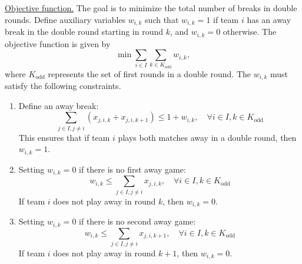 \documentclass{article}
\begin{document}
\medskip
\noindent
\underline{Objective function.}
The goal is to minimize the total number of breaks in double rounds. Define auxiliary variables $w_{i,k}$ such that $w_{i,k}=1$ if team $i$ has an away break in the double round starting in round $k$, and $w_{i,k}=0$ otherwise. The objective function is given by
\begin{equation}
    \min \sum_{i \in I} \sum_{k \in K_{\text{odd}}} w_{i,k},
\end{equation}
where $K_{\text{odd}}$ represents the set of first rounds in a double round.
The $w_{i,k}$ must satisfy the following constraints.
\begin{enumerate}
    \item Define an away break:
    \begin{equation}
    \sum_{j \in I, j \neq i} (x_{j,i,k} + x_{j,i,k+1}) \leq 1 + w_{i,k}, \quad \forall i \in I, k \in K_{\text{odd}}
    \end{equation}
    This ensures that if team $i$ plays both matches away in a double round, then $w_{i,k} =1$.
    \item Setting $w_{i,k} =0$ if there is no first away game:
    \begin{equation}
    w_{i,k} \leq \sum_{j \in I, j \neq i} x_{j,i,k}, \quad \forall i \in I, k \in K_{\text{odd}}
    \end{equation}
    If team $i$ does not play away in round $k$, then $w_{i,k} =0$.
    \item Setting $w_{i,k} =0$ if there is no second away game:
    \begin{equation}
    w_{i,k} \leq \sum_{j \in I, j \neq i} x_{j,i,k+1}, \quad \forall i \in I, k \in K_{\text{odd}}
    \end{equation}
    If team $i$ does not play away in round $k+1$, then $w_{i,k} =0$.
\end{enumerate}
\end{document}
